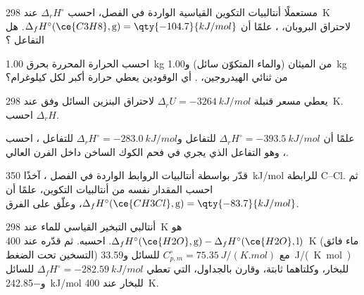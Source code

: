 \begin{exercise}[$\star$]\label{exo:b2:reaction-enthalpy:1}
مستعملًا أنتالبيات التكوين القياسية الواردة في الفصل، احسب
$\Delta_r H^\circ$ عند \qty{298}{K} لاحتراق البروبان،
، علمًا أن $\Delta_f
H^\circ(\ce{C3H8}, \text{g}) = \qty{-104.7}{kJ/mol}$. هل التفاعل ؟
\end{exercise}

\begin{exercise}[$\star$]\label{exo:b2:reaction-enthalpy:2}
احسب الحرارة المحررة بحرق \qty{1.00}{kg} من الميثان (والماء المتكوّن
سائل) و\qty{1.00}{kg} من ثنائي الهيدروجين، . أي الوقودين يعطي حرارة أكبر لكل كيلوغرام؟
\end{exercise}

\begin{exercise}[$\star$]\label{exo:b2:reaction-enthalpy:3}
يعطي مسعر قنبلة $\Delta_r U = \qty{-3264}{kJ/mol}$ لاحتراق البنزين
السائل وفق  عند
\qty{298}{K}. احسب $\Delta_r H$.
\end{exercise}

\begin{exercise}[$\star$]\label{exo:b2:reaction-enthalpy:4}
علمًا أن $\Delta_r H^\circ = \qty{-393.5}{kJ/mol}$ للتفاعل  و$\Delta_r H^\circ = \qty{-283.0}{kJ/mol}$ للتفاعل ، احسب  ،
وهو التفاعل الذي يجري في فحم الكوك الساخن داخل الفرن العالي.
\end{exercise}

\begin{exercise}[$\star\star$]\label{exo:b2:reaction-enthalpy:5}
قدّر بواسطة أنتالبيات الروابط الواردة في الفصل 
، آخذًا \qty{350}{kJ/mol} للرابطة
C--Cl. ثم احسب المقدار نفسه من أنتالبيات التكوين، علمًا أن
$\Delta_f H^\circ(\ce{CH3Cl}, \text{g}) = \qty{-83.7}{kJ/mol}$، وعلّق على
الفرق.
\end{exercise}

\begin{exercise}[$\star\star$]\label{exo:b2:reaction-enthalpy:6}
أنتالبي التبخير القياسي للماء عند \qty{298}{K} هو
$\Delta_f H^\circ(\ce{H2O}, \text{g}) - \Delta_f H^\circ(\ce{H2O},
\text{l})$. احسبه. ثم قدّره عند \qty{400}{K} (ماء فائق التسخين تحت الضغط)
مع $C_{p,m}^\circ = \qty{75.35}{J/(K.mol)}$ للسائل
و\qty{33.59}{J/(K.mol)} للبخار، وكلتاهما ثابتة، وقارن بالجداول، التي
تعطي $\Delta_f H^\circ =
\qty{-282.59}{kJ/mol}$ للسائل و\qty{-242.85}{kJ/mol} للبخار عند
\qty{400}{K}.
\end{exercise}

